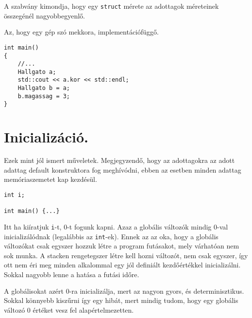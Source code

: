 \documentclass[a4paper,11.5pt]{article}
\begin{document}
	\begin{note}
		A szabvány kimondja, hogy egy \texttt{struct} mérete az adottagok méreteinek összegénél nagyobbegyenlő.
	\end{note}
	Az, hogy egy gép szó mekkora, implementációfüggő.
	\begin{lstlisting}
int main()
{
	//...
	Hallgato a;
	std::cout << a.kor << std::endl;
	Hallgato b = a;
	b.magassag = 3;
}
	\end{lstlisting}      
	\section{Inicializáció.}
	Ezek mint jól ismert műveletek. Megjegyzendő, hogy az adottagokra az adott adattag default konstruktora fog meghívódni, ebben az esetben minden adattag memóriaszemetet kap kezdésül.
	\begin{lstlisting}
int i;

int main() {...}
	\end{lstlisting}   
	Itt ha kiíratjuk \texttt{i}-t, 0-t fogunk kapni. Azaz a globális változók mindig 0-val inicializálódnak (legalábbis az \texttt{int}-ek). Ennek az az oka, hogy a globális változókat csak egyszer hozzuk létre a program futásakot, mely várhatóan nem sok munka. A stacken rengetegszer létre kell hozni változót, nem csak egyszer, így ott nem éri meg minden alkalommal egy jól definiált kezdőértékkel inicializálni. Sokkal nagyobb lenne a hatása a futási időre.
	
	A globálisokat azért 0-ra inicializálja, mert az nagyon gyors, és determinisztikus. Sokkal könnyebb kiszűrni így egy hibát, mert mindig tudom, hogy egy globális változó 0 értéket vesz fel alapértelmezetten.
	
\end{document}
